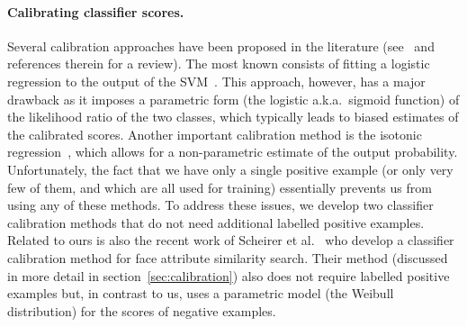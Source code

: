     \paragraph{Calibrating classifier scores.} 
  Several calibration approaches have been proposed in the literature (see~\cite{gebel2007calibrating} and references therein for a review). The most known consists of fitting a logistic regression to the output of the SVM~\cite{Platt99}.  This approach, however, has a major drawback as it imposes a parametric form (the logistic a.k.a.\ sigmoid function) of the likelihood ratio of the two classes, which typically leads to biased estimates of the calibrated scores. Another important calibration method is the isotonic regression~\cite{zadrozny2002transforming}, which allows for a non-parametric estimate of the output probability.
  Unfortunately, the fact that we have only a single positive example (or only very few of them, and which are all used for training) essentially prevents us from using any of these methods. 
  To address these issues, we develop two classifier calibration methods that do not need additional labelled positive examples. Related to ours is also the recent work of Scheirer et al.~\cite{Scheirer12} who develop a classifier calibration method for face attribute similarity search. Their method (discussed in more detail in section~\ref{sec:calibration}) also does not require labelled positive examples but, in contrast to us, uses a parametric model (the Weibull distribution) for the scores of negative examples.    

  

